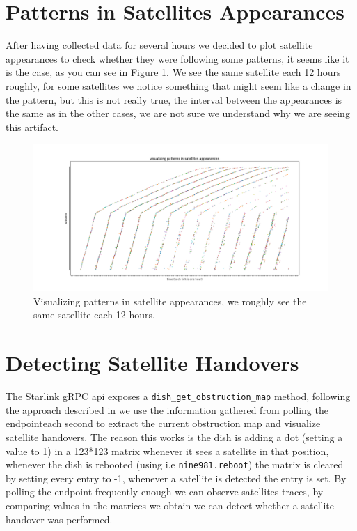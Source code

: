 \documentclass[IN,11pt,twoside,openright,bachelor,english]{tumthesis}
\begin{document}
\section{Patterns in Satellites Appearances}
After having collected data for several hours we decided to plot satellite appearances to check whether they were following some patterns, it seems like it is the case, as you can see in Figure \ref{fig:vis-sat-pat}. We see the same satellite each 12 hours roughly, for some satellites we notice something that might seem like a change in the pattern, but this is not really true, the interval between the appearances is the same as in the other cases, we are not sure we understand why we are seeing this artifact.

\begin{figure}
	\label{fig:vis-sat-pat}
	\centering
	\includegraphics[width=1.2\columnwidth]{img/visualizing-how-long-satellites-are-visible-for.png}
	\caption{Visualizing patterns in satellite appearances, we roughly see the same satellite each 12 hours.}
\end{figure}

\section{Detecting Satellite Handovers}

The Starlink gRPC api exposes a \texttt{dish\_get\_obstruction\_map} method, following the approach described in \cite{izhikevich2023democratizing} we use the information gathered from polling the endpointeach second to extract the current obstruction map and visualize satellite handovers. The reason this works is the dish is adding a dot (setting a value to 1) in a 123*123 matrix whenever it sees a satellite in that position, whenever the dish is rebooted (using i.e \texttt{nine981.reboot}) the matrix is cleared by setting every entry to -1, whenever a satellite is detected the entry is set. By polling the endpoint frequently enough we can observe satellites traces, by comparing values in the matrices we obtain we can detect whether a satellite handover was performed.
\end{document}
